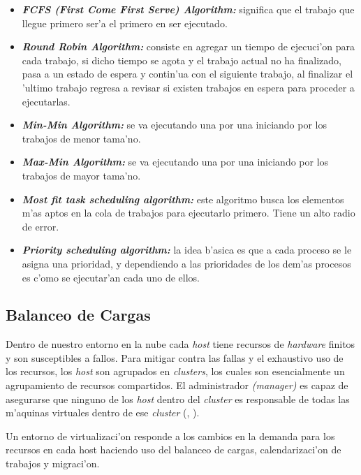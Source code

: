 \begin{itemize}
	\item \textit{\textbf{FCFS (First Come First Serve) Algorithm:}} significa que el trabajo que llegue primero ser'a el primero en ser ejecutado.
	\item \textit{\textbf{Round Robin Algorithm:}} consiste en agregar un tiempo de ejecuci'on para cada trabajo, si dicho tiempo se agota y el trabajo actual no ha finalizado, pasa a un estado de espera y contin'ua con el siguiente trabajo, al finalizar el 'ultimo trabajo regresa a revisar si existen trabajos en espera para proceder a ejecutarlas. 
	\item  \textit{\textbf{Min-Min Algorithm:}} se va ejecutando una por una iniciando por los trabajos de menor tama'no.
	\item  \textit{\textbf{Max-Min Algorithm:}} se va ejecutando una por una iniciando por los trabajos de mayor tama'no.
	\item  \textit{\textbf{Most fit task scheduling algorithm:}} este algoritmo busca los elementos m'as aptos en la cola de trabajos para ejecutarlo primero. Tiene un alto radio de error.
	\item \textit{\textbf{Priority scheduling algorithm:}} la idea b'asica es que a cada proceso se le asigna una prioridad, y dependiendo a las prioridades de los dem'as procesos es c'omo se ejecutar'an cada uno de ellos.
\end{itemize}

\subsection*{Balanceo de Cargas}

Dentro de nuestro entorno en la nube cada \textit{host} tiene recursos de \textit{hardware} finitos y son susceptibles a fallos. Para mitigar contra las fallas y el exhaustivo uso de los recursos, los \textit{host} son agrupados en \textit{clusters}, los cuales son esencialmente un agrupamiento de recursos compartidos. El administrador \textit{(manager)} es capaz de asegurarse que ninguno de los \textit{host} dentro del \textit{cluster} es responsable de todas las m'aquinas virtuales dentro de ese \textit{cluster} (\citeauthor{redhat}, \citeyear{redhat}).

Un entorno de virtualizaci'on responde a los cambios en la demanda para los recursos en cada host haciendo uso del balanceo de cargas, calendarizaci'on de trabajos y migraci'on.

